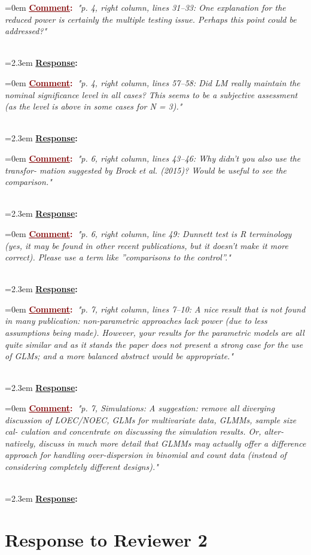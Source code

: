 \documentclass[12pt]{article}
\newcommand{\comment}[1]{
	\vspace{2em} \noindent \hangindent=0em \textbf{\textcolor{Maroon}{\uline{Comment}:~}}\emph{"#1"}
	}
\newcommand{\response}[1]{
	\\[0.25em] 
	\hangindent=2.3em \textbf{\textcolor{NavyBlue}{\uline{Response}:~}}#1 
	}
\begin{document}
\comment{p. 4, right column, lines 31–33: One explanation for the reduced power
is certainly the multiple testing issue. Perhaps this point could be
addressed?}
\response{}

\comment{p. 4, right column, lines 57–58: Did LM really maintain the nominal
significance level in all cases? This seems to be a subjective assessment
(as the level is above in some cases for N = 3).}
\response{}

\comment{p. 6, right column, lines 43–46: Why didn’t you also use the transfor-
mation suggested by Brock et al. (2015)? Would be useful to see the
comparison.}
\response{}

\comment{p. 6, right column, line 49: Dunnett test is R terminology (yes, it
may be found in other recent publications, but it doesn’t make it more
correct). Please use a term like ”comparisons to the control”.}
\response{}

\comment{p. 7, right column, lines 7–10: A nice result that is not found in
many publication: non-parametric approaches lack power (due to less
assumptions being made). However, your results for the parametric
models are all quite similar and as it stands the paper does not present
a strong case for the use of GLMs; and a more balanced abstract would
be appropriate.}
\response{}

\comment{p. 7, Simulations: A suggestion: remove all diverging discussion of
LOEC/NOEC, GLMs for multivariate data, GLMMs, sample size cal-
culation and concentrate on discussing the simulation results. Or, alter-
natively, discuss in much more detail that GLMMs may actually offer a
difference approach for handling over-dispersion in binomial and count
data (instead of considering completely different designs).}
\response{}




\section{Response to Reviewer 2}
\end{document}

